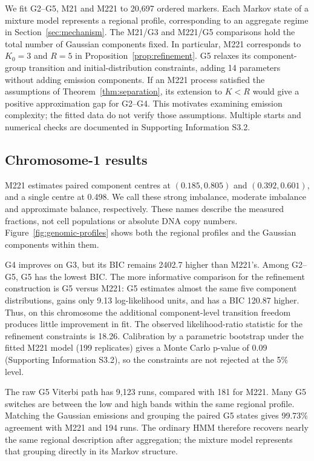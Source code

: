 \documentclass[11pt]{article}
\theoremstyle{definition}
\begin{document}
We fit G2--G5, M21 and M221 to 20,697 ordered markers. Each Markov state
of a mixture model represents a regional profile, corresponding to an
aggregate regime in Section~\ref{sec:mechanism}.
The M21/G3 and M221/G5 comparisons hold the total
number of Gaussian components fixed. In particular, M221 corresponds to
$K_0=3$ and $R=5$ in Proposition~\ref{prop:refinement}. G5 relaxes its
component-group transition and initial-distribution constraints, adding
14 parameters without adding emission components. If an M221 process
satisfied the assumptions of Theorem~\ref{thm:separation}, its extension
to $K<R$ would give a positive approximation gap for G2--G4. This motivates
examining emission complexity; the fitted data do not verify those assumptions.
Multiple starts and
numerical checks are documented in Supporting Information S3.2.

\subsection{Chromosome-1 results}\label{sec:genomic-results}



M221 estimates paired component centres at $(0.185,0.805)$ and
$(0.392,0.601)$, and a single centre at 0.498. We call these strong imbalance,
moderate imbalance and approximate balance, respectively. These names
describe the measured fractions, not cell populations or absolute DNA copy
numbers. Figure~\ref{fig:genomic-profiles} shows both the regional profiles
and the Gaussian components within them.

G4 improves on G3, but its BIC remains 2402.7 higher than M221's.
Among G2--G5, G5 has the lowest BIC. The more informative comparison for
the refinement construction is G5 versus M221: G5 estimates almost the
same five component distributions, gains only 9.13 log-likelihood units,
and has a BIC 120.87 higher. Thus, on this chromosome the additional
component-level transition freedom produces little improvement in fit.
The observed likelihood-ratio statistic for the refinement constraints is
18.26. Calibration by a parametric bootstrap under the fitted M221 model
(199 replicates) gives a Monte Carlo p-value of 0.09 (Supporting Information
S3.2), so the constraints are not rejected at the 5\% level.

The raw G5 Viterbi path has 9,123 runs, compared with 181 for M221.
Many G5 switches are between the low and high bands within the same regional
profile. Matching the Gaussian emissions and grouping the paired G5 states
gives 99.73\% agreement with M221 and 194 runs. The ordinary HMM therefore
recovers nearly the same regional description after aggregation; the
mixture model represents that grouping directly in its Markov structure.
\end{document}
